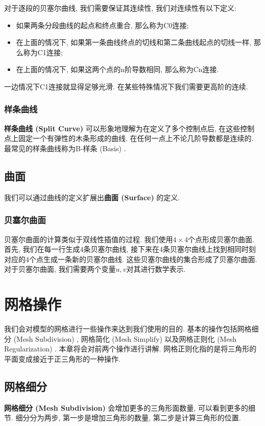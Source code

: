 \documentclass[openany]{progbookcn}
\begin{document}
对于逐段的贝塞尔曲线, 我们需要保证其连续性, 我们对连续性有以下定义: 
\begin{itemize}
	\item 如果两条分段曲线的起点和终点重合, 那么称为C0连接; 
	\item 在上面的情况下, 如果第一条曲线终点的切线和第二条曲线起点的切线一样, 那么称为C1连接; 
	\item 在上面的情况下, 如果这两个点的n阶导数相同, 那么称为Cn连接. 
\end{itemize}
一边情况下C1连接就显得足够光滑. 在某些特殊情况下我们需要更高阶的连续. 

\subsection{样条曲线}
\textbf{样条曲线 (Split Curve) }可以形象地理解为在定义了多个控制点后, 在这些控制点上固定一个有弹性的木条形成的曲线. 在任何一点上不论几阶导数都是连续的. 最常见的样条曲线称为B-样条 (Basis) . 

\section{曲面}
我们可以通过曲线的定义扩展出\textbf{曲面 (Surface) }的定义. 

\subsection{贝塞尔曲面}
贝塞尔曲面的计算类似于双线性插值的过程. 我们使用$4\times 4$个点形成贝塞尔曲面. 首先, 我们在每一行生成4条贝塞尔曲线, 接下来在4条贝塞尔曲线上找到相同时刻对应的4个点生成一条新的贝塞尔曲线. 这些贝塞尔曲线的集合形成了贝塞尔曲面. 对于贝塞尔曲面, 我们需要两个变量$u,v$对其进行数学表示. 

\chapter{网格操作}
我们会对模型的网格进行一些操作来达到我们使用的目的. 基本的操作包括网格细分 (Mesh Subdivision) , 网格简化 (Mesh Simplify) 以及网格正则化 (Mesh Regularization) . 本章将会对前两个操作进行讲解. 网格正则化指的是将三角形的平面变成接近于正三角形的一种操作. 

\section{网格细分}
\textbf{网格细分 (Mesh Subdivision) }会增加更多的三角形面数量, 可以看到更多的细节. 细分分为两步, 第一步是增加三角形的数量, 第二步是计算三角形的位置. 
\end{document}

